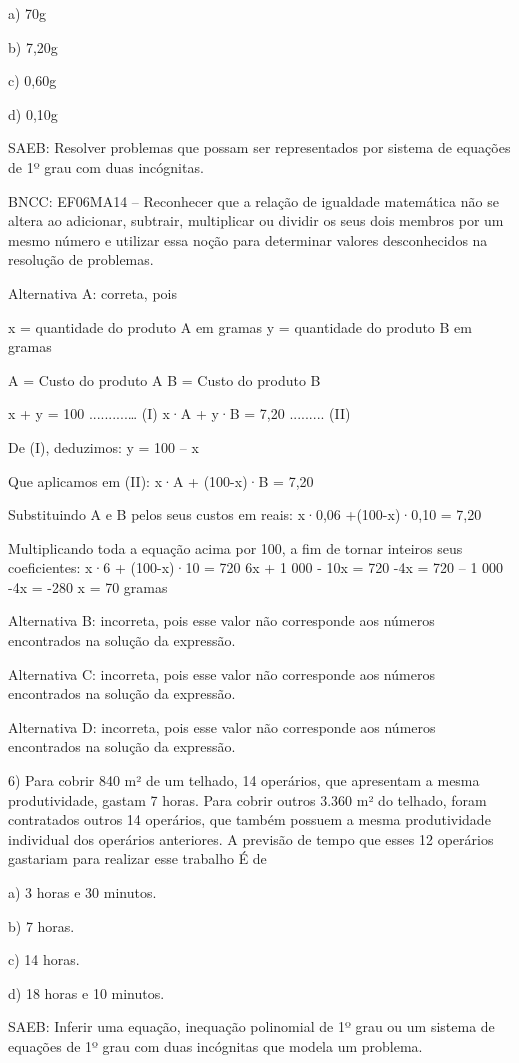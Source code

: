 a) 70g

b) 7,20g

c) 0,60g

d) 0,10g

SAEB: Resolver problemas que possam ser representados por sistema de
equações de 1º grau com duas incógnitas.

BNCC: EF06MA14 -- Reconhecer que a relação de igualdade matemática não
se altera ao adicionar, subtrair, multiplicar ou dividir os seus dois
membros por um mesmo número e utilizar essa noção para determinar
valores desconhecidos na resolução de problemas.

Alternativa A: correta, pois

x = quantidade do produto A em gramas y = quantidade do produto B em
gramas

A = Custo do produto A B = Custo do produto B

x + y = 100 ..........\ldots{} (I) x·A + y·B = 7,20 ......... (II)

De (I), deduzimos: y = 100 -- x

Que aplicamos em (II): x·A + (100-x)·B = 7,20

Substituindo A e B pelos seus custos em reais: x·0,06 +(100-x)·0,10 =
7,20

Multiplicando toda a equação acima por 100, a fim de tornar inteiros
seus coeficientes: x·6 + (100-x)·10 = 720 6x + 1 000 - 10x = 720 -4x =
720 -- 1 000 -4x = -280 x = 70 gramas

Alternativa B: incorreta, pois esse valor não corresponde aos números
encontrados na solução da expressão.

Alternativa C: incorreta, pois esse valor não corresponde aos números
encontrados na solução da expressão.

Alternativa D: incorreta, pois esse valor não corresponde aos números
encontrados na solução da expressão.

6) Para cobrir 840 m² de um telhado, 14 operários, que apresentam a
mesma produtividade, gastam 7 horas. Para cobrir outros 3.360 m² do
telhado, foram contratados outros 14 operários, que também possuem a
mesma produtividade individual dos operários anteriores. A previsão de
tempo que esses 12 operários gastariam para realizar esse trabalho É de

a) 3 horas e 30 minutos.

b) 7 horas.

c) 14 horas.

d) 18 horas e 10 minutos.

SAEB: Inferir uma equação, inequação polinomial de 1º grau ou um sistema
de equações de 1º grau com duas incógnitas que modela um problema.

